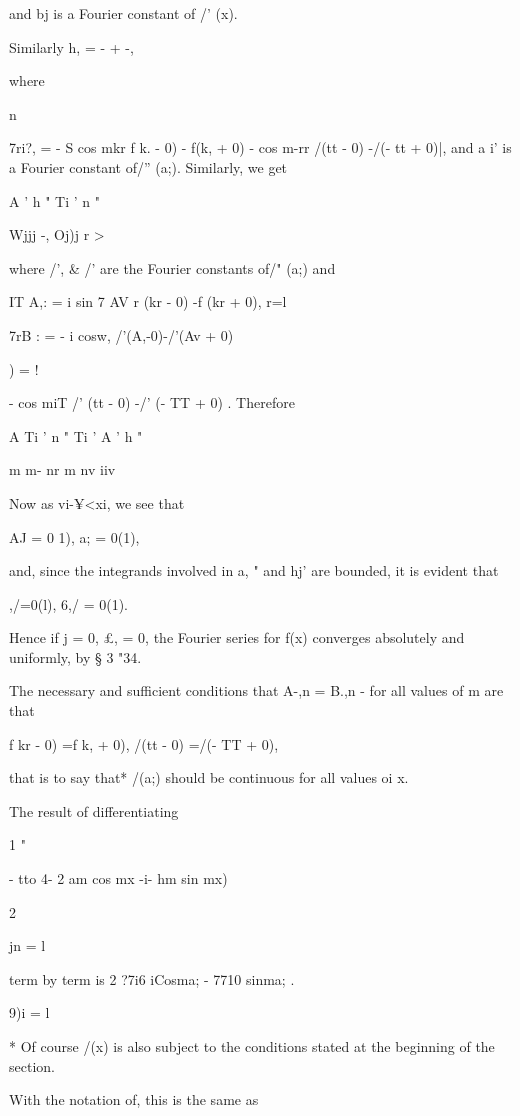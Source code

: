 and bj is a Fourier constant of /' (x).

Similarly h, = - + -,

where

n

7ri?, = - S cos mkr f k. - 0) - f(k, + 0) - cos m-rr /(tt - 0) -/(- tt
+ 0)|, and a i' is a Fourier constant of/'' (a;). Similarly, we get

A ' h " Ti ' n "

Wjjj -, Oj)j r >

where /', \& /' are the Fourier constants of/" (a;) and

IT A,: = i sin 7 AV r (kr - 0) -f (kr + 0), r=l

7rB : = - i cosw, /'(A,-0)-/'(Av + 0)

) = !

- cos miT /' (tt - 0) -/' (- TT + 0) . Therefore

A Ti ' n " Ti ' A ' h "

m m- nr m nv iiv

Now as vi-¥<xi, we see that

AJ = 0 1), a; = 0(1),

and, since the integrands involved in a, " and hj' are bounded, it is
evident that

,/=0(l), 6,/ = 0(1).

Hence if j = 0, £, = 0, the Fourier series for f(x) converges
absolutely and uniformly, by § 3 "34.

The necessary and sufficient conditions that A-,n = B.,n - for all
values of m are that

f kr - 0) =f k, + 0), /(tt - 0) =/(- TT + 0),

that is to say that* /(a;) should be continuous for all values oi x.


The result of differentiating

1 "

- tto 4- 2 am cos mx -i- hm sin mx)

2

jn = l

term by term is 2 ?7i6 iCosma; - 7710 sinma; .

9)i = l

* Of course /(x) is also subject to the conditions stated at the
beginning of the section.

%
%

With the notation of, this is the same as

